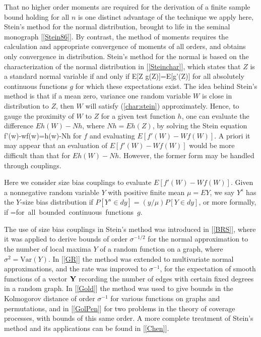 \documentclass[10pt, amstex]{article}
\begin{document}
That no higher order moments are required for the derivation of a finite sample bound holding
for all $n$ is one distinct advantage of the technique we apply here, Stein's method for
the normal distribution, brought to life in the seminal
monograph [\ref{Stein86}]. By contrast,
the method of moments requires the calculation and appropriate convergence of moments of all orders,
and obtains only convergence in distribution. Stein's method for the normal is based on the
characterization of the normal distribution in [\ref{Steinchar}], which states that $Z$ is a
standard normal variable if and only if
\bea
\label{char:stein}
E[Z g(Z)]=E[g'(Z)]
\ena
for all absolutely continuous functions $g$ for which these expectations exist. The idea behind Stein's
method is that if a mean zero, variance one random variable $W$ is close in distribution to $Z$, then $W$
will satisfy (\ref{char:stein}) approximately. Hence, to gauge the proximity of $W$ to $Z$ for a given
test function $h$, one can evaluate the difference $Eh(W)-Nh$, where $Nh=Eh(Z)$, by solving the Stein equation
\beas
f'(w)-wf(w)=h(w)-Nh
\enas
for $f$ and evaluating $E[f'(W)-Wf(W)]$.
A priori it may appear that an evaluation of $E[f'(W)-Wf(W)]$ would
be more difficult than that for $Eh(W)-Nh$. However, the former form may be
handled through couplings.


Here we consider size bias
couplings to evaluate $E[f'(W)-Wf(W)]$. Given a nonnegative random variable $Y$
with positive finite mean $\mu=EY$, we say $Y^s$ has the $Y$-size
bias distribution if $P[Y^s \in dy] = (y/\mu) P[Y \in dy]$, or
more formally, if
\bea \E [Y g(Y)]=\mu \E [g(Y^s)] \quad \mbox{for all
bounded continuous functions $g$.} \label{formalsb}
\ena

The use of size bias couplings in Stein's method was introduced in
[\ref{BRS}], where it was applied to derive bounds of order
$\sigma^{-1/2}$ for the normal approximation to the number of local
maxima $Y$ of a random function on a graph, where
$\sigma^2=\mbox{Var}(Y)$. In [\ref{GR}] the method was extended to
multivariate normal approximations, and the rate was improved to
$\sigma^{-1}$, for the expectation of smooth functions of a vector
${\bf Y}$ recording the number of edges with certain fixed degrees
in a random graph. In [\ref{Gold}] the method was used to give
bounds in the Kolmogorov distance of order $\sigma^{-1}$ for various
functions on graphs and permutations, and in [\ref{GolPen}] for two
problems in the theory of coverage processes, with bounds of this
same order. A more complete treatment of Stein's method and its applications can
be found in [\ref{Chen}].
\end{document}
